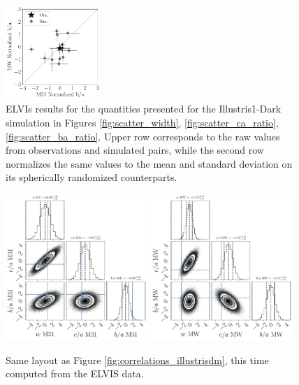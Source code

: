 \documentclass[a4paper,fleqn,usenatbib]{mnras}
\begin{document}
\begin{figure}
\includegraphics[width=0.32\textwidth]{scatter_norm_ranked_elvis_ba_ratio.pdf}
\caption{ELVIs results for the quantities presented for the Illustris1-Dark
  simulation in Figures  \ref{fig:scatter_width},
  \ref{fig:scatter_ca_ratio}, \ref{fig:scatter_ba_ratio}.
Upper row corresponds to the raw values from observations and
simulated pairs, while the second row normalizes the same values to
the mean and standard deviation on its spherically randomized
counterparts. 
\label{fig:scatter_elvis}}
\end{figure}

\begin{figure}
\centering
\includegraphics[width=0.48\textwidth]{gaussian_model_elvis_M31_n_11.pdf}
\includegraphics[width=0.48\textwidth]{gaussian_model_elvis_MW_n_11.pdf}
\caption{
Same layout as Figure \ref{fig:correlations_illustrisdm}, this time
computed from the ELVIS data.
\label{fig:correlations_elvis}}
\end{figure}
\end{document}
